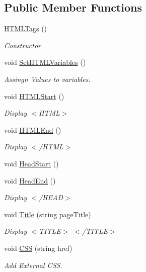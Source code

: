 \subsection*{Public Member Functions}
\begin{DoxyCompactItemize}
\item 
\hyperlink{classHTMLTags_a4f0bb4f538b87033b574ff05798eb60b}{H\-T\-M\-L\-Tags} ()
\begin{DoxyCompactList}\small\item\em Constructor. \end{DoxyCompactList}\item 
void \hyperlink{classHTMLTags_abe32ec84b6b2940afbc993be2db178e9}{Set\-H\-T\-M\-L\-Variables} ()
\begin{DoxyCompactList}\small\item\em Assingn Values to variables. \end{DoxyCompactList}\item 
void \hyperlink{classHTMLTags_a567551cd701d2836d4240b2917b5e13f}{H\-T\-M\-L\-Start} ()
\begin{DoxyCompactList}\small\item\em Display $<$\-H\-T\-M\-L$>$ \end{DoxyCompactList}\item 
void \hyperlink{classHTMLTags_a6553c3d01ee194a1d157e6341333dee3}{H\-T\-M\-L\-End} ()
\begin{DoxyCompactList}\small\item\em Display $<$/\-H\-T\-M\-L$>$ \end{DoxyCompactList}\item 
void \hyperlink{classHTMLTags_af2b01cc08884af52e0b291d07035062e}{Head\-Start} ()
\item 
void \hyperlink{classHTMLTags_afdc779e46fac16cc79e4f0e87f621254}{Head\-End} ()
\begin{DoxyCompactList}\small\item\em Display $<$/\-H\-E\-A\-D$>$ \end{DoxyCompactList}\item 
void \hyperlink{classHTMLTags_a5128d6f1c6be5ac1689047fc9d0d159f}{Title} (string page\-Title)
\begin{DoxyCompactList}\small\item\em Display $<$\-T\-I\-T\-L\-E$>$ $<$/\-T\-I\-T\-L\-E$>$ \end{DoxyCompactList}\item 
void \hyperlink{classHTMLTags_a4e9e18580cc7f2b82c82e4f81e39be50}{C\-S\-S} (string href)
\begin{DoxyCompactList}\small\item\em Add External C\-S\-S. \end{DoxyCompactList}\item 

\end{DoxyCompactItemize}
